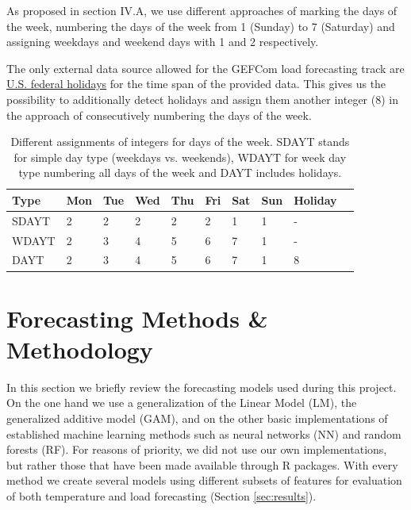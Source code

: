 \documentclass[conference]{IEEEtran}
\begin{document}
As proposed in \cite{Hyndman2010} section IV.A, we use different approaches of marking the days of the week, numbering the days of the week from 1 (Sunday) to 7 (Saturday) and assigning weekdays and weekend days with 1 and 2 respectively.\par
The only external data source allowed for the GEFCom load forecasting track are \href{http://archive.opm.gov/Operating\_Status\_Schedules/fedhol/2014.asp}{U.S. federal holidays} for the time span of the provided data. This gives us the possibility to additionally detect holidays and assign them another integer (8) in the approach of consecutively numbering the days of the week.\par

\begin{table}[h]
\centering
\begin{tabular}{@{}llllllllll@{}}
\toprule
 Type & Mon & Tue & Wed & Thu & Fri & Sat & Sun & Holiday \\ \midrule
SDAYT & 2 & 2 & 2 & 2 & 2 & 1 & 1 & - \\
WDAYT & 2 & 3 & 4 & 5 & 6 & 7 & 1 & - \\
DAYT & 2 & 3 & 4 & 5 & 6 & 7 & 1 & 8 \\ \bottomrule
\end{tabular}
\caption{Different assignments of integers for days of the week. SDAYT stands for simple day type (weekdays vs. weekends), WDAYT for week day type numbering all days of the week and DAYT includes holidays.}
\label{my-label}
\end{table}

\section{Forecasting Methods \& Methodology}
In this section we briefly review the forecasting models used during this project. On the one hand we use a generalization of the Linear Model (LM), the generalized additive model (GAM), and on the other basic implementations of established machine learning methods such as neural networks (NN) and random forests (RF). For reasons of priority, we did not use our own implementations, but rather those that have been made available through R packages. With every method we create several models using different subsets of features for evaluation of both temperature and load forecasting (Section \ref{sec:results}).
\end{document}
